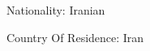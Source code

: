 

\begin{cventries}

\vspace{5mm}

  \begin{cvitems} %
  	\item {Nationality: Iranian}
    \item {Country Of Residence: Iran}
   \end{cvitems}
    
\end{cventries}

